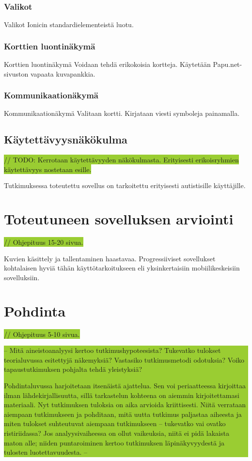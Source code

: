 \documentclass[utf8]{gradu3}
\begin{document}
\subsection{Valikot}
Valikot
Ionicin standardielementeistä luotu.

\subsection{Korttien luontinäkymä}
Korttien luontinäkymä
Voidaan tehdä erikokoisia kortteja. Käytetään Papu.net-sivuston vapaata kuvapankkia.

\subsection{Kommunikaationäkymä}
Kommunikaationäkymä
Valitaan kortti. Kirjataan viesti symboleja painamalla.

\section{Käytettävyysnäkökulma}

\colorbox{YellowGreen}{// TODO: Kerrotaan käytettävyyden näkökulmasta. Erityisesti erikoisryhmien käytettävyys nostetaan esille.}

Tutkimuksessa toteutettu sovellus on tarkoitettu erityisesti autistisille käyttäjille.

\chapter{Toteutuneen sovelluksen arviointi}
\colorbox{YellowGreen}{// Ohjepituus 15-20 sivua.}

Kuvien käsittely ja tallentaminen haastavaa. Progressiiviset sovellukset kohtalaisen hyviä tähän käyttötarkoitukseen eli yksinkertaisiin mobiilikeskeisiin sovelluksiin.

\chapter{Pohdinta}
\colorbox{YellowGreen}{// Ohjepituus 5-10 sivua.}

\colorbox{YellowGreen}{-- Mitä aineistoanalyysi kertoo tutkimushypoteesista? Tukevatko tulokset teorialuvussa esitettyjä näkemyksiä? Vastasiko tutkimusmetodi odotuksia? Voiko tapaustutkimuksen pohjalta tehdä yleistyksiä?

Pohdintaluvussa harjoitetaan itsenäistä ajattelua. Sen voi periaatteessa kirjoittaa ilman lähdekirjallisuutta, sillä tarkastelun kohteena on aiemmin kirjoitettamasi materiaali. Nyt tutkimuksen tuloksia on aika arvioida kriittisesti. Niitä verrataan aiempaan tutkimukseen ja pohditaan, mitä uutta tutkimus paljastaa aiheesta ja miten tulokset suhteutuvat aiempaan tutkimukseen – tukevatko vai ovatko ristiriidassa? Jos analyysivaiheessa on ollut vaikeuksia, niitä ei pidä lakaista maton alle; niiden puntaroiminen kertoo tutkimuksen läpinäkyvyydestä ja tulosten luotettavuudesta. --}
\end{document}
